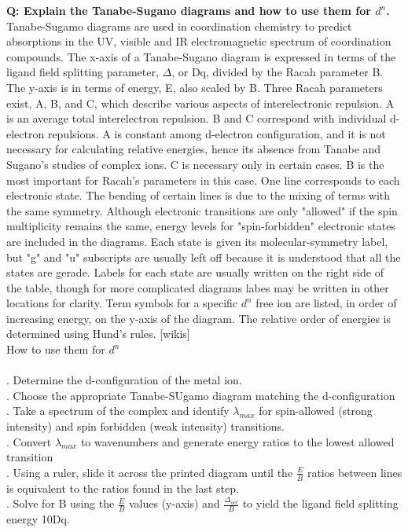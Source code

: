 \documentclass{article}
\begin{document}
\newpage
\noindent \textbf{Q: Explain the Tanabe-Sugano diagrams and how to use them for $d^n$.}\\
\noindent Tanabe-Sugamo diagrams are used in coordination chemistry to predict absorptions in the UV, visible and IR electromagnetic spectrum of coordination compounds. The x-axis of a Tanabe-Sugano diagram is expressed in terms of the ligand field splitting parameter, $\Delta$, or Dq, divided by the Racah parameter B. The y-axis is in terms of energy, E, also scaled by B. Three Racah parameters exist, A, B, and C, which describe various aspects of interelectronic repulsion. A is an average total interelectron repulsion. B and C correspond with individual d-electron repulsions. A is constant among d-electron configuration, and it is not necessary for calculating relative energies, hence its absence from Tanabe and Sugano's studies of complex ions. C is necessary only in certain cases. B is the most important for Racah's parameters in this case. One line corresponds to each electronic state. The bending of certain lines is due to the mixing of terms with the same symmetry. Although electronic transitions are only "allowed" if the spin multiplicity remains the same, energy levels for "spin-forbidden" electronic states are included in the diagrams. Each state is given its molecular-symmetry label, but "g" and "u" subscripts are usually left off because it is understood that all the states are gerade. Labels for each state are usually written on the right side of the table, though for more complicated diagrams labes may be written in other locations for clarity. Term symbols for a specific $d^n$ free ion are listed, in order of increasing energy, on the y-axis of the diagram. The relative order of energies is determined using Hund's rules. [wikis]\\
\noindent How to use them for $d^n$\\
\noindent \\
. Determine the d-configuration of the metal ion.\\
. Choose the appropriate Tanabe-SUgamo diagram matching the d-configuration\\
. Take a spectrum of the complex and identify $\lambda_{max}$ for spin-allowed (strong intensity) and spin forbidden (weak intensity) transitions.\\
. Convert $\lambda_{max}$ to wavenumbers and generate energy ratios to the lowest allowed transition\\
. Using a ruler, slide it across the printed diagram until the $\frac{E}{B}$ ratios between lines is equivalent to the ratios found in the last step.\\
. Solve for B using the $\frac{E}{B}$ values (y-axis) and $\frac{\Delta_{oct}}{B}$ to yield the ligand field splitting energy 10Dq.
\end{document}
